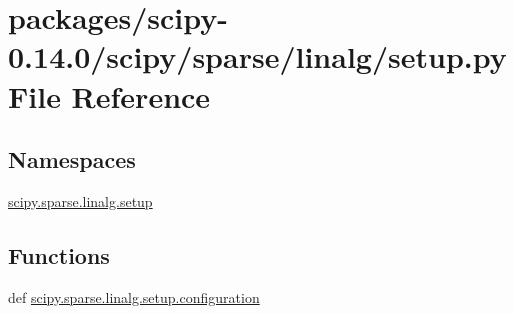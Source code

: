 \hypertarget{packages_2scipy-0_814_80_2scipy_2sparse_2linalg_2setup_8py}{}\section{packages/scipy-\/0.14.0/scipy/sparse/linalg/setup.py File Reference}
\label{packages_2scipy-0_814_80_2scipy_2sparse_2linalg_2setup_8py}
\subsection*{Namespaces}
\begin{DoxyCompactItemize}
\item 
 \hyperlink{namespacescipy_1_1sparse_1_1linalg_1_1setup}{scipy.\+sparse.\+linalg.\+setup}
\end{DoxyCompactItemize}
\subsection*{Functions}
\begin{DoxyCompactItemize}
\item 
def \hyperlink{namespacescipy_1_1sparse_1_1linalg_1_1setup_a676886878014fc0492ef5865f56e05b3}{scipy.\+sparse.\+linalg.\+setup.\+configuration}
\end{DoxyCompactItemize}
